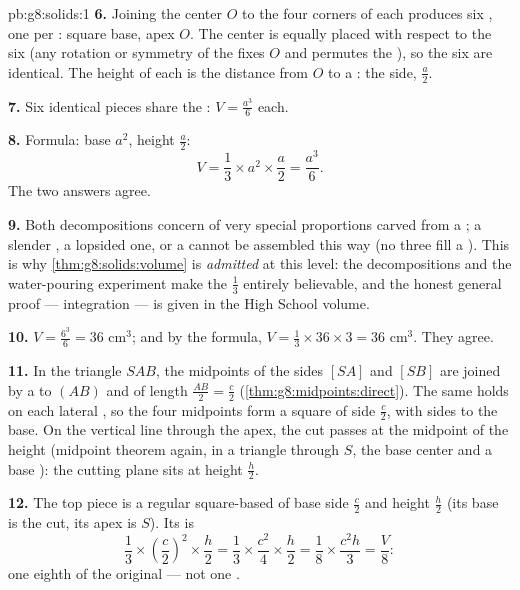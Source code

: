 \begin{solution}{pb:g8:solids:1}
\textbf{6.} Joining the center $O$ to the four corners of each
 produces six , one per : square base, apex $O$.
The center is equally placed with respect to the six  (any
rotation or symmetry of the  fixes $O$ and permutes the
), so the six  are identical. The height of each is
the distance from $O$ to a :  the side, $\frac{a}{2}$.

\textbf{7.} Six identical pieces share the :
$V = \frac{a^3}{6}$ each.

\textbf{8.} Formula: base  $a^2$, height $\frac a2$:
\[
V = \frac13 \times a^2 \times \frac{a}{2} = \frac{a^3}{6} .
\]
The two answers agree.

\textbf{9.} Both decompositions concern  of very special
proportions carved from a ; a slender , a lopsided
one, or a  cannot be assembled this way (no three  fill
a ). This is why \cref{thm:g8:solids:volume} is
\emph{admitted} at this level: the decompositions and the
water-pouring experiment make the $\frac13$ entirely believable,
and the honest general proof --- integration --- is given in the
High School volume.

\textbf{10.} $V = \frac{6^3}{6} = 36$ cm$^3$; and by the formula,
$V = \frac13 \times 36 \times 3 = 36$ cm$^3$. They agree.

\textbf{11.} In the triangle $SAB$, the midpoints of the sides
$[SA]$ and $[SB]$ are joined by a   to $(AB)$ and
of length $\frac{AB}{2} = \frac{c}{2}$
(\cref{thm:g8:midpoints:direct}). The same holds on each lateral
, so the four midpoints form a square of side $\frac c2$,
with sides  to the base. On the vertical line through
the apex, the cut passes at the midpoint of the height (midpoint
theorem again, in a triangle through $S$, the base center and a
base ): the cutting plane sits at height $\frac h2$.

\textbf{12.} The top piece is a regular square-based  of
base side $\frac c2$ and height $\frac h2$ (its base is the cut,
its apex is $S$). Its  is
\[
\frac13 \times \left(\frac c2\right)^2 \times \frac h2
= \frac13 \times \frac{c^2}{4} \times \frac h2
= \frac{1}{8} \times \frac{c^2 h}{3}
= \frac{V}{8} :
\]
one eighth of the original --- not one .


\end{solution}
